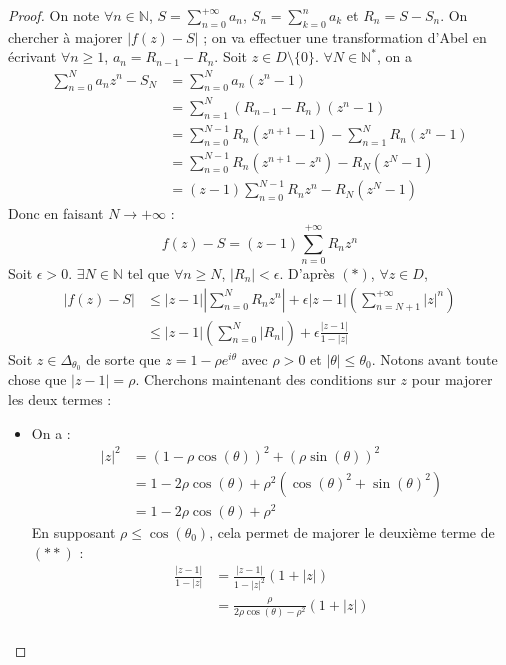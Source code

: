   \begin{proof}
    On note $\forall n \in \mathbb{N}$, $S = \sum_{n=0}^{+\infty} a_n$, $S_n = \sum_{k=0}^n a_k$ et $R_n = S - S_n$. On chercher à majorer $|f(z) - S|$ ; on va effectuer une transformation d'Abel en écrivant $\forall n \geq 1$, $a_n = R_{n-1} - R_n$. Soit $z \in D \setminus \{ 0 \}$. $\forall N \in \mathbb{N}^*$, on a
    \begin{align*}
      \sum_{n=0}^N a_n z^n - S_N &= \sum_{n=0}^N a_n(z^n - 1) \\
      &= \sum_{n=1}^N (R_{n-1} - R_n)(z^n - 1) \\
      &= \sum_{n=0}^{N-1} R_n(z^{n+1} - 1) - \sum_{n=1}^N R_n(z^n - 1) \\
      &= \sum_{n=0}^{N-1} R_n(z^{n+1} - z^n) - R_N(z^N - 1) \\
      &= (z-1) \sum_{n=0}^{N-1} R_nz^n - R_N(z^N - 1)
    \end{align*}
    Donc en faisant $N \rightarrow +\infty$ :
    \[ f(z) - S = (z-1) \sum_{n=0}^{+\infty} R_nz^n \tag{$*$} \]
    Soit $\epsilon > 0$. $\exists N \in \mathbb{N}$ tel que $\forall n \geq N$, $|R_n| < \epsilon$. D'après $(*)$, $\forall z \in D$,
    \begin{align*}
      |f(z)-S| &\leq |z-1| \left| \sum_{n=0}^N R_n z^n \right| + \epsilon |z-1| \left( \sum_{n=N+1}^{+\infty} |z|^n \right) \\
      &\leq |z-1| \left( \sum_{n=0}^N |R_n| \right) + \epsilon \frac{|z-1|}{1-|z|} \tag{$**$}
    \end{align*}
    Soit $z \in \Delta_{\theta_0}$ de sorte que $z = 1-\rho e^{i\theta}$ avec $\rho > 0$ et $|\theta| \leq \theta_0$. Notons avant toute chose que $|z-1| = \rho$. Cherchons maintenant des conditions sur $z$ pour majorer les deux termes :
    \begin{itemize}
      \item On a :
      \begin{align*}
        |z|^2 &= (1 - \rho \cos(\theta))^2 + (\rho \sin(\theta))^2 \\
        &= 1 - 2 \rho \cos(\theta) + \rho^2 (\cos(\theta)^2 + \sin(\theta)^2) \\
        &= 1 - 2 \rho \cos(\theta) + \rho^2
      \end{align*}
      En supposant $\rho \leq \cos(\theta_0)$, cela permet de majorer le deuxième terme de $(**)$ :
      \begin{align*}
        \frac{|z-1|}{1-|z|} &= \frac{|z-1|}{1-|z|^2}(1+|z|) \\
        &= \frac{\rho}{2 \rho \cos(\theta) - \rho^2}(1+|z|) \\

\end{align*}
\end{itemize}
\end{proof}
